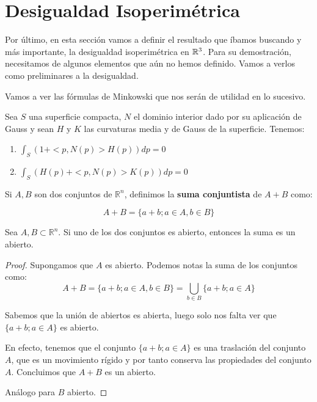 \section{Desigualdad Isoperimétrica}
Por último, en esta sección vamos a definir el resultado que íbamos buscando y  más importante, la desigualdad isoperimétrica en $\mathbb{R}^3$. Para su demostración, necesitamos de algunos elementos que aún no hemos definido. Vamos a verlos como preliminares a la desigualdad.

Vamos a ver las fórmulas de Minkowski que nos serán de utilidad en lo sucesivo.
\begin{theorem}
Sea $S$ una superficie compacta, $N$ el dominio interior dado por su aplicación de Gauss y sean $H$ y $K$ las curvaturas media y de Gauss de la superficie. Tenemos:

\begin{enumerate}
    \item $\int_S (1+<p, N(p)>H(p))dp = 0$
    \item $\int_S (H(p)+<p, N(p)>K(p))dp = 0$
\end{enumerate}
\end{theorem}

\begin{definition}
Si $A, B$ son dos conjuntos de $\mathbb{R}^n$, definimos la \textbf{suma conjuntista} de $A+B$ como:

\begin{equation*}
    A+B = \{a+b; a \in A, b \in B\}
\end{equation*}
\end{definition}

\begin{lemma}
Sea $A,B \subset \mathbb{R}^n$. Si uno de los dos conjuntos es abierto, entonces la suma es un abierto.
\end{lemma}
\begin{proof}
Supongamos que $A$ es abierto.
Podemos notas la suma de los conjuntos como:
\begin{equation*}
    A + B = \{a+b; a \in A, b \in B\} = \bigcup_{b \in B} \{a+b; a \in A\}
\end{equation*}

Sabemos que la unión de abiertos es abierta, luego solo nos falta ver que $\{a+b; a \in A\}$ es abierto.

En efecto, tenemos que el conjunto $\{a+b; a \in A\}$ es una traslación del conjunto $A$, que es un movimiento rígido y por tanto conserva las propiedades del conjunto $A$. Concluimos que $A+B$ es un abierto.

Análogo para $B$ abierto.
\end{proof}


